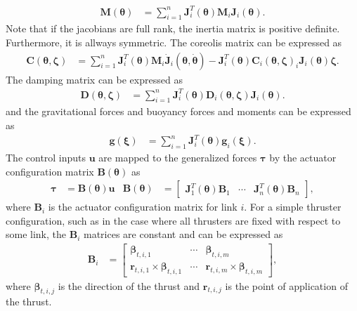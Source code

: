 \begin{align}
    \bm{M}(\bm{\theta}) &= \sum_{i=1}^{n} \bm{J}_{i}^T(\bm{\theta}) \bm{M}_i \bm{J}_{i}(\bm{\theta}).
\end{align}
Note that if the jacobians are full rank, the inertia matrix is positive definite.
Furthermore, it is allways symmetric. The coreolis matrix can be expressed as
\begin{align}
    \bm{C}(\bm{\theta}, \bm{\zeta}) &=
    \sum_{i=1}^{n} \bm{J}_{i}^T(\bm{\theta}) \bm{M}_i \dot{\bm{J}}_{i}(\bm{\theta},\dot{\bm{\theta}})
    -\bm{J}_{i}^T(\bm{\theta}) \bm{C}_i(\bm{\theta},\bm{\zeta})_i \bm{J}_{i}(\bm{\theta}) \bm{\zeta}.
\end{align}
The damping matrix can be expressed as
\begin{align}
    \bm{D}(\bm{\theta}, \bm{\zeta}) &=
    \sum_{i=1}^{n} \bm{J}_{i}^T(\bm{\theta}) \bm{D}_i(\bm{\theta},\bm{\zeta}) \bm{J}_{i}(\bm{\theta}).
\end{align}
and the gravitational forces and buoyancy forces and moments can be expressed as
\begin{align}
    \bm{g}(\bm{\xi}) &=
    \sum_{i=1}^{n} \bm{J}_{i}^T(\bm{\theta}) \bm{g}_i(\bm{\xi}).
\end{align}
The control inputs $\bm{u}$ are mapped to the generalized forces $\bm{\tau}$ by
the actuator configuration matrix $\bm{B}(\bm{\theta})$ as
\begin{align}
    \bm{\tau} &= \bm{B}(\bm{\theta}) \bm{u} &
    \bm{B}(\bm{\theta}) &= \begin{bmatrix}
        \bm{J}_1^T(\bm{\theta}) \bm{B}_1 & \cdots & \bm{J}_n^T(\bm{\theta}) \bm{B}_n
    \end{bmatrix},
\end{align}
where $\bm{B}_i$ is the actuator configuration matrix for link $i$. For a simple
thruster configuration, such as in the case where all thrusters are fixed with
respect to some link, the $\bm{B}_i$ matrices are constant and can be expressed
as
\begin{align}
    \bm{B}_i &= \begin{bmatrix}
        \bm{\beta}_{t,i,1} & \cdots & \bm{\beta}_{t,i,m} \\
        \bm{r}_{t,i,1} \times \bm{\beta}_{t,i,1} & \cdots & \bm{r}_{t,i,m} \times \bm{\beta}_{t,i,m}
    \end{bmatrix},
\end{align}
where $\bm{\beta}_{t,i,j}$ is the direction of the thrust and $\bm{r}_{t,i,j}$
is the point of application of the thrust.





